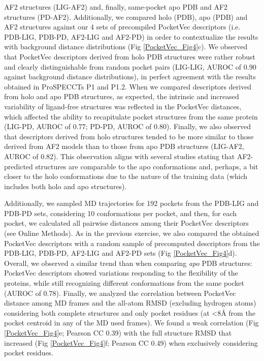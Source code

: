 AF2 structures (LIG-AF2) and, finally, same-pocket apo PDB and AF2 structures (PD-AF2). Additionally, we compared holo (PDB), apo (PDB) and AF2 structures against our 4 sets of precompiled PocketVec descriptors (i.e. PDB-LIG, PDB-PD, AF2-LIG and AF2-PD) in order to contextualize the results with background distance distributions (Fig \ref{PocketVec_Fig4}c). We observed that PocketVec descriptors derived from holo PDB structures were rather robust and clearly distinguishable from random pocket pairs (LIG-LIG, AUROC of 0.90 against background distance distributions), in perfect agreement with the results obtained in ProSPECCTs P1 and P1.2. When we compared descriptors derived from holo and apo PDB structures, as expected, the intrinsic and increased variability of ligand-free structures was reflected in the PocketVec distances, which affected the ability to recapitulate pocket structures from the same protein (LIG-PD, AUROC of 0.77; PD-PD, AUROC of 0.80). Finally, we also observed that descriptors derived from holo structures tended to be more similar to those derived from AF2 models than to those from apo PDB structures (LIG-AF2, AUROC of 0.82). This observation aligns with several studies stating that AF2-predicted structures are comparable to the apo conformations and, perhaps, a bit closer to the holo conformations due to the nature of the training data (which includes both holo and apo structures)\cite{zhang_benchmarking_2023}.


Additionally, we sampled MD trajectories for 192 pockets from the PDB-LIG and PDB-PD sets, considering 10 conformations per pocket, and then, for each pocket, we calculated all pairwise distances among their PocketVec descriptors (see Online Methods). As in the previous exercise, we also compared the obtained PocketVec descriptors with a random sample of precomputed descriptors from the PDB-LIG, PDB-PD, AF2-LIG and AF2-PD sets (Fig \ref{PocketVec_Fig4}d). Overall, we observed a similar trend than when comparing \textit{apo} PDB structures: PocketVec descriptors showed variations responding to the flexibility of the proteins, while still recognizing different conformations from the same pocket (AUROC of 0.78). Finally, we analyzed the correlation between PocketVec distance among MD frames and the all-atom RMSD (excluding hydrogen atoms) considering both complete structures and only pocket residues (at <8Å from the pocket centroid in any of the MD used frames). We found a weak correlation (Fig \ref{PocketVec_Fig4}e; Pearson CC 0.39) with the full structure RMSD that increased (Fig \ref{PocketVec_Fig4}f; Pearson CC 0.49) when exclusively considering pocket residues. 

